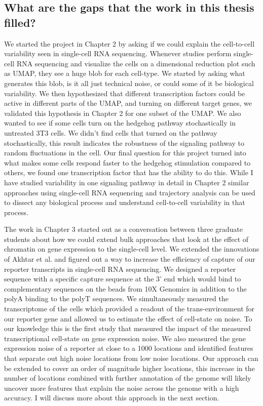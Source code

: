 \subsection{What are the gaps that the work in this thesis filled?}

We started the project in Chapter 2 by asking if we could explain the cell-to-cell variability seen in single-cell RNA sequencing. Whenever studies perform single-cell RNA sequencing and visualize the cells on a dimensional reduction plot such as UMAP, they see a huge blob for each cell-type. We started by asking what generates this blob, is it all just technical noise, or could some of it be biological variability. We then hypothesized that different transcription factors could be active in different parts of the UMAP, and turning on different target genes, we validated this hypothesis in Chapter 2 for one subset of the UMAP. We also wanted to see if some cells turn on the hedgehog pathway stochastically in untreated 3T3 cells. We didn't find cells that turned on the pathway stochastically, this result indicates the robustness of the signaling pathway to random fluctuations in the cell. Our final question for this project turned into what makes some cells respond faster to the hedgehog stimulation compared to others, we found one transcription factor that has the ability to do this. While I have studied variability in one signaling pathway in detail in Chapter 2 similar approaches using single-cell RNA sequencing and trajectory analysis can be used to dissect any biological process and understand cell-to-cell variability in that process.

The work in Chapter 3 started out as a conversation between three graduate students about how we could extend bulk approaches that look at the effect of chromatin on gene expression to the single-cell level. We extended the innovations of Akhtar et al. \cite{akhtarw_vansteenselb:ChromatinPosition2013} and figured out a way to increase the efficiency of capture of our reporter transcripts in single-cell RNA sequencing. We designed a reporter sequence with a specific capture sequence at the 3' end which would bind to complementary sequences on the beads from 10X Genomics in addition to the polyA binding to the polyT sequences. We simultaneously measured the transcriptome of the cells which provided a readout of the trans-environment for our reporter gene and allowed us to estimate the effect of cell-state on noise. To our knowledge this is the first study that measured the impact of the measured transcriptional cell-state on gene expression noise. We also measured the gene expression noise of a reporter at close to a 1000 locations and identified features that separate out high noise locations from low noise locations. Our approach can be extended to cover an order of magnitude higher locations, this increase in the number of locations combined with further annotation of the genome will likely uncover more features that explain the noise across the genome with a high accuracy. I will discuss more about this approach in the next section.

